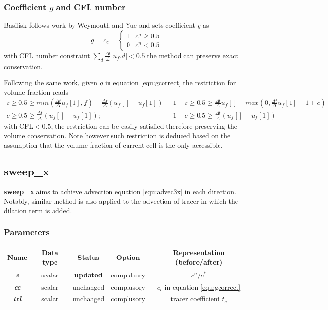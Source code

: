 \documentclass[a4paper]{article}
\newcommand{\func}[1]{\textbf{\textcolor{function}{#1}}}
\newcommand{\para}[1]{\textbf{\emph{\textcolor{para}{#1}}}}
\begin{document}
\subsubsection{Coefficient $g$ and CFL number}
Basilisk follows work by Weymouth and Yue\cite{2010_Weymouth} and sets coefficient $g$ as 
\begin{equation}\label{equ:gcorrect}
    g=c_c=\left\{
    \begin{array}{cc}
    1     &  c^n \geq 0.5\\
    0     &  c^n <0.5
    \end{array}
    \right.
\end{equation}
with CFL number constraint $\sum_d \frac{\Delta t}{\Delta}|u_f.d|<0.5$ the method can preserve exact conservation.\par
Following the same work, given $g$ in equation \ref{equ:gcorrect} the restriction for volume fraction reads
\begin{align}
    c\geq0.5\geq min(\frac{\Delta t}{\Delta} u_f[1],f)+\frac{\Delta t}{\Delta}(u_f[]-u_f[1]);&\  1-c\geq0.5\geq \frac{\Delta t}{\Delta}u_f[]-max(0,\frac{\Delta t}{\Delta}u_f[1]-1+c)\\
    c\geq0.5\geq \frac{\Delta t}{\Delta}(u_f[]-u_f[1]);&\  1-c\geq0.5\geq \frac{\Delta t}{\Delta}(u_f[]-u_f[1])\label{equ:restriction}
\end{align}
with CFL$<0.5$, the restriction can be easily satisfied therefore preserving the volume conservation. Note however such restriction is deduced based on the assumption that the volume fraction of current cell is the only accessible.

\subsection{\func{sweep\_x}}
\func{sweep\_x} aims to achieve advection equation \ref{equ:advec3x} in each direction. Notably, similar method is also applied to the advection of tracer in which the dilation term is added.
\subsubsection{Parameters}
\begin{table}[h]
  \centering
  \begin{tabular}{|c|c|c|c|c|}
    \hline
    Name & Data type & Status & Option & Representation (before/after)\\[0.5ex]
    \hline\hline
    \rowcolor{output} \para{c} & scalar & \textbf{updated} & compulsory & $c^n$/$c^\ast$\\
    \hline
    \para{cc} & scalar & unchanged & complusory & $c_c$ in equation \ref{equ:gcorrect}\\
    \hline
    \para{tcl} & scalar & unchanged & complusory & tracer coefficient $t_c$\\
    \hline
  \end{tabular}
\end{table}
\end{document}
